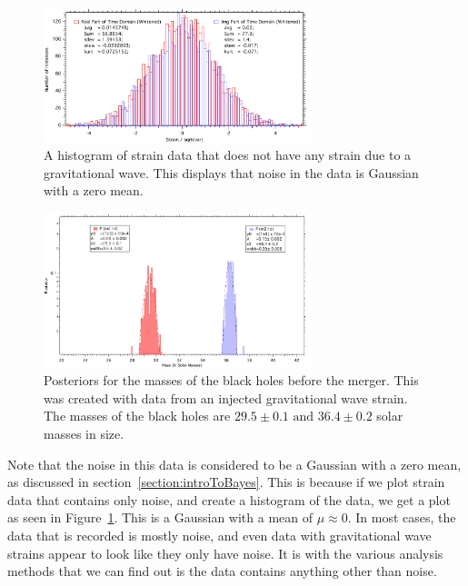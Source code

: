 \documentclass{article}
\begin{document}
 
    \begin{figure}[h]
    	\centering
    	\includegraphics[width=0.7\textwidth]{Figures/NoiseHistogram.pdf} 
    	\caption{A histogram of strain data that does not have any strain due to a gravitational wave. This displays that noise in the data is Gaussian with a zero mean.}
    	\label{Fig:NoiseHist}
    \end{figure}

        
        \begin{figure}[h!]
        	\centering
        	\includegraphics[width=0.7\textwidth]{Figures/MassPost.pdf} 
        	\caption{Posteriors for the masses of the black holes before the  merger. This was created with data from an injected gravitational wave strain. The masses  of the black holes are $29.5\pm0.1 \text{ and } 36.4\pm0.2$ solar masses in size.}
        	\label{Fig:1Dmasses}
        \end{figure}
        
 
 Note that the noise in this data is considered to be a Gaussian with a zero mean, as discussed in section~\ref{section:introToBayes}. This is because if we plot strain data that contains only noise, and create a histogram of the data, we get a plot as seen in Figure~\ref{Fig:NoiseHist}. This is a Gaussian with a mean of $\mu \approx 0$. In most cases, the data that is recorded is mostly noise, and even data with gravitational wave strains appear to look like they only have noise. It is with the various analysis methods that we can find out is the data contains anything other than noise.\\
  
\end{document}

